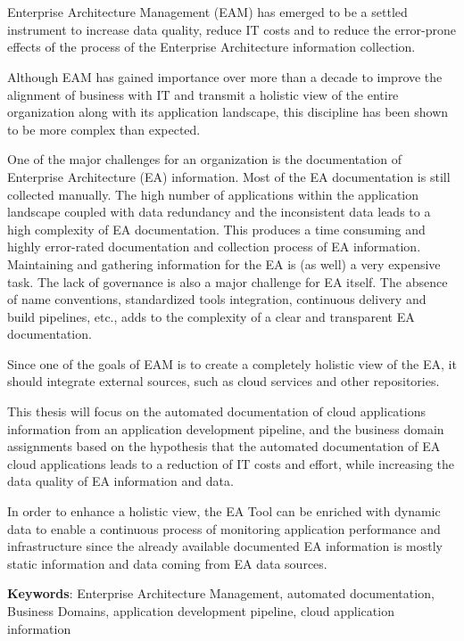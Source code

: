\chapter{\abstractname}

Enterprise Architecture Management (EAM) has emerged to be a settled instrument to increase data quality, reduce IT costs and to reduce the error-prone effects of the process of the Enterprise Architecture information collection.

Although EAM has gained importance over more than a decade to improve the alignment of business with IT and transmit a holistic view of the entire organization along with its application landscape, this discipline has been shown to be more complex than expected.

One of the major challenges for an organization is the documentation of Enterprise Architecture (EA) information. Most of the EA documentation is still collected manually. The high number of applications within the application landscape coupled with data redundancy and the inconsistent data leads to a high complexity of EA documentation. This produces a time consuming and highly error-rated documentation and collection process of EA information. Maintaining and gathering information for the EA is (as well) a very expensive task.  The lack of governance is also a major challenge for EA itself. The absence of name conventions, standardized tools integration, continuous delivery and build pipelines, etc., adds to the complexity of a clear and transparent EA documentation.

Since one of the goals of EAM is to create a completely holistic view of the EA, it should integrate external sources, such as cloud services and other repositories.

This thesis will focus on the automated documentation of cloud applications information from an application development pipeline, and the business domain assignments based on the hypothesis that the automated documentation of EA cloud applications leads to a reduction of IT costs and effort, while increasing the data quality of EA information and data.

In order to enhance a holistic view, the EA Tool can be enriched with dynamic data to enable a continuous process of monitoring application performance and infrastructure since the already available documented EA information is mostly static information and data coming from EA data sources.

\textbf{Keywords}: Enterprise Architecture Management, automated documentation, Business Domains, application development pipeline, cloud application information
